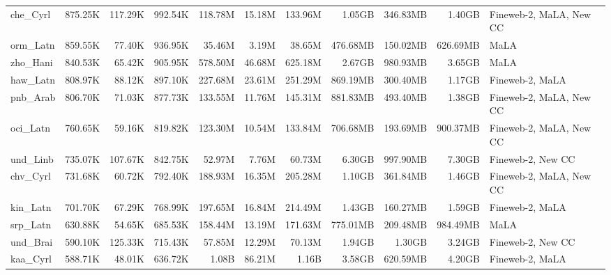 \begin{table*}[!htp]
{\begin{tabular}{l|rrr|rrr|rrr|l}
che\_Cyrl                   & 875.25K    & 117.29K      & 992.54K     & 118.78M      & 15.18M         & 133.96M       & 1.05GB     & 346.83MB     & 1.40GB      & Fineweb-2, MaLA, New CC \\
orm\_Latn                   & 859.55K    & 77.40K       & 936.95K     & 35.46M       & 3.19M          & 38.65M        & 476.68MB   & 150.02MB     & 626.69MB    & MaLA                    \\
zho\_Hani                   & 840.53K    & 65.42K       & 905.95K     & 578.50M      & 46.68M         & 625.18M       & 2.67GB     & 980.93MB     & 3.65GB      & MaLA                    \\
haw\_Latn                   & 808.97K    & 88.12K       & 897.10K     & 227.68M      & 23.61M         & 251.29M       & 869.19MB   & 300.40MB     & 1.17GB      & Fineweb-2, MaLA         \\
pnb\_Arab                   & 806.70K    & 71.03K       & 877.73K     & 133.55M      & 11.76M         & 145.31M       & 881.83MB   & 493.40MB     & 1.38GB      & Fineweb-2, MaLA, New CC \\
oci\_Latn                   & 760.65K    & 59.16K       & 819.82K     & 123.30M      & 10.54M         & 133.84M       & 706.68MB   & 193.69MB     & 900.37MB    & Fineweb-2, MaLA, New CC \\
und\_Linb                   & 735.07K    & 107.67K      & 842.75K     & 52.97M       & 7.76M          & 60.73M        & 6.30GB     & 997.90MB     & 7.30GB      & Fineweb-2, New CC       \\
chv\_Cyrl                   & 731.68K    & 60.72K       & 792.40K     & 188.93M      & 16.35M         & 205.28M       & 1.10GB     & 361.84MB     & 1.46GB      & Fineweb-2, MaLA, New CC \\
kin\_Latn                   & 701.70K    & 67.29K       & 768.99K     & 197.65M      & 16.84M         & 214.49M       & 1.43GB     & 160.27MB     & 1.59GB      & Fineweb-2, MaLA         \\
srp\_Latn                   & 630.88K    & 54.65K       & 685.53K     & 158.44M      & 13.19M         & 171.63M       & 775.01MB   & 209.48MB     & 984.49MB    & MaLA                    \\
und\_Brai                   & 590.10K    & 125.33K      & 715.43K     & 57.85M       & 12.29M         & 70.13M        & 1.94GB     & 1.30GB       & 3.24GB      & Fineweb-2, New CC       \\
kaa\_Cyrl                   & 588.71K    & 48.01K       & 636.72K     & 1.08B        & 86.21M         & 1.16B         & 3.58GB     & 620.59MB     & 4.20GB      & Fineweb-2, MaLA         \\

\end{tabular}}
\end{table*}
